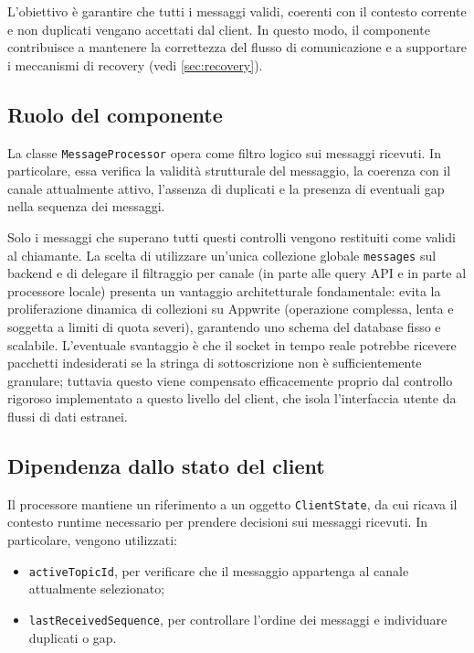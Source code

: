 \documentclass[a4paper, 11pt, twoside]{report}
\begin{document}
L'obiettivo è garantire che tutti i messaggi validi, coerenti con il contesto corrente e non duplicati vengano accettati dal client.
In questo modo, il componente contribuisce a mantenere la correttezza del flusso di comunicazione e a supportare i meccanismi di 
recovery (vedi \ref{sec:recovery}).

\subsection{Ruolo del componente}

La classe \texttt{MessageProcessor} opera come filtro logico sui messaggi ricevuti. In particolare, essa verifica la validità 
strutturale del messaggio, la coerenza con il canale attualmente attivo, l'assenza di duplicati e la presenza di eventuali gap nella
sequenza dei messaggi.

Solo i messaggi che superano tutti questi controlli vengono restituiti come validi al chiamante. La scelta di utilizzare un'unica 
collezione globale \texttt{messages} sul backend e di delegare il filtraggio per canale (in parte alle query API e in parte al processore
locale) presenta un vantaggio architetturale fondamentale: evita la proliferazione dinamica di collezioni su Appwrite (operazione
complessa, lenta e soggetta a limiti di quota severi), garantendo uno schema del database fisso e scalabile.
L'eventuale svantaggio è che il socket in tempo reale potrebbe ricevere pacchetti indesiderati se la stringa di sottoscrizione non è
sufficientemente granulare; tuttavia questo viene compensato efficacemente proprio dal controllo rigoroso implementato a questo livello
del client, che isola l'interfaccia utente da flussi di dati estranei.

\subsection{Dipendenza dallo stato del client}

Il processore mantiene un riferimento a un oggetto \texttt{ClientState}, da cui ricava il contesto runtime necessario per prendere 
decisioni sui messaggi ricevuti. In particolare, vengono utilizzati:

\begin{itemize}
    \item \texttt{activeTopicId}, per verificare che il messaggio appartenga al canale attualmente selezionato;
    \item \texttt{lastReceivedSequence}, per controllare l'ordine dei messaggi e individuare duplicati o gap.
\end{itemize}
\end{document}
